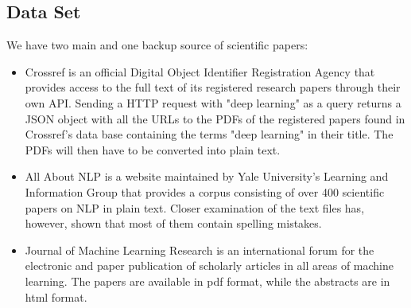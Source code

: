 \subsection{Data Set}
\label{subsec:data}
We have two main and one backup source of scientific papers:
\begin{itemize}
	\item Crossref \cite{crossref} is an official Digital Object Identifier Registration Agency that provides access to the full text of its registered research papers through their own API. Sending a HTTP request with "deep learning" as a query returns a JSON object with all the URLs to the PDFs of the registered papers found in Crossref's data base containing the terms "deep learning" in their title. The PDFs will then have to be converted into plain text.
	\item All About NLP \cite{aan} is a website maintained by Yale University's Learning and Information Group that provides a corpus consisting of over 400 scientific papers on NLP in plain text. Closer examination of the text files has, however, shown that most of them contain spelling mistakes.
	\item Journal of Machine Learning Research \cite{jmlr} is an international forum for the electronic and paper publication of scholarly articles in all areas of machine learning. The papers are available in pdf format, while the abstracts are in html format.
\end{itemize}
